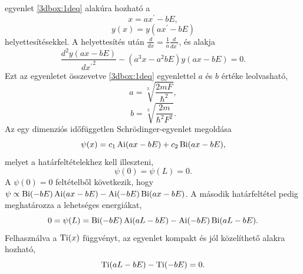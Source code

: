  egyenlet \eqref{3dbox:1deq} alakúra hozható a
\begin{equation}
	x = ax^\prime - bE,
\end{equation}
\begin{equation}
	y(x) = y(ax^\prime - bE)
\end{equation}
helyettesítésekkel. A helyettesítés után $\frac{d}{dx} = \frac{1}{a}\frac{d}{dx^\prime}$, és  alakja
\begin{equation}
	\frac{d^2y(ax-bE)}{{dx^\prime}^2} - \left(a^3x - a^2bE\right)y(ax-bE) = 0.
\end{equation}
Ezt az egyenletet összevetve \eqref{3dbox:1deq} egyenlettel $a$ és $b$ értéke leolvasható,
\begin{equation}
	a = \sqrt[3]{\frac{2mF}{\hbar^2}},
\end{equation}
\begin{equation}
	b = \sqrt[3]{\frac{2m}{\hbar^2F^2}}.
\end{equation}
Az egy dimenziós időfüggetlen Schrödinger-egyenlet megoldása
\begin{equation}
	\psi(x) = c_1\operatorname{Ai}(ax-bE)+c_2\operatorname{Bi}(ax-bE),
\end{equation}
melyet a határfeltételekhez kell illeszteni,
\begin{equation}
	\psi(0) = \psi(L) = 0.
\end{equation}
A $\psi(0) = 0$ feltételből következik, hogy $\psi \propto \operatorname{Bi}(-bE)\operatorname{Ai}(ax-bE) - \operatorname{Ai}(-bE)\operatorname{Bi}(ax-bE)$. A második határfeltétel pedig meghatározza a lehetséges energiákat,
\begin{equation}
		0 = \psi(L) = \operatorname{Bi}(-bE)\operatorname{Ai}(aL-bE) - \operatorname{Ai}(-bE)\operatorname{Bi}(aL-bE).
		\label{vegesf:aibilevels}
\end{equation}
Felhasználva a $\operatorname{Ti}(x)$ függvényt, az egyenlet kompakt és jól közelíthető alakra hozható,
\begin{equation}
	\label{box_energiaszintek_egyenlet}
	\operatorname{Ti}(aL-bE) - \operatorname{Ti}(-bE) = 0.
\end{equation}
